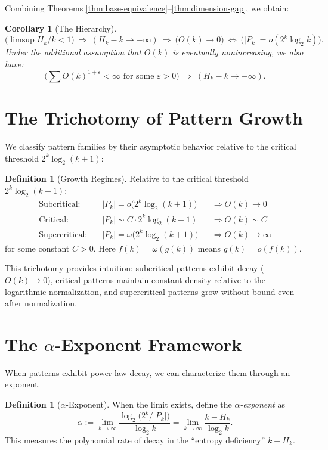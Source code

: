 \documentclass[11pt]{article}
\newtheorem{corollary}[theorem]{Corollary}
\theoremstyle{definition}
\newtheorem{definition}[theorem]{Definition}
\newcommand{\eps}{\varepsilon}
\begin{document}
Combining Theorems \ref{thm:base-equivalence}--\ref{thm:dimension-gap}, we obtain:

\begin{corollary}[The Hierarchy]\label{cor:hierarchy}
\begin{equation}\label{eq:lattice}
\big(\limsup H_k/k<1\big)\ \Rightarrow\ (H_k-k\to-\infty)\ \Rightarrow\ \big(O(k)\to 0\big)\ \Leftrightarrow\ \big(|P_k|=o(2^k\log_2 k)\big).
\end{equation}
Under the additional assumption that $O(k)$ is eventually nonincreasing, we also have:
$$\big(\sum O(k)^{1+\eps} < \infty \text{ for some } \eps > 0\big)\ \Rightarrow\ (H_k-k\to-\infty).$$
\end{corollary}

\section{The Trichotomy of Pattern Growth}

We classify pattern families by their asymptotic behavior relative to the critical threshold $2^k\log_2(k+1)$:

\begin{definition}[Growth Regimes]\label{def:regimes}
Relative to the critical threshold $2^k \log_2(k+1)$:
\begin{align*}
\text{Subcritical:}&\quad |P_k|=o\big(2^k\log_2(k+1)\big) &&\Rightarrow O(k)\to 0\\
\text{Critical:}&\quad |P_k|\sim C\cdot 2^k\log_2(k+1) &&\Rightarrow O(k)\sim C\\
\text{Supercritical:}&\quad |P_k|=\omega\big(2^k\log_2(k+1)\big) &&\Rightarrow O(k)\to\infty
\end{align*}
for some constant $C > 0$. Here $f(k) = \omega(g(k))$ means $g(k) = o(f(k))$.
\end{definition}

This trichotomy provides intuition: subcritical patterns exhibit decay ($O(k) \to 0$), critical patterns maintain constant density relative to the logarithmic normalization, and supercritical patterns grow without bound even after normalization.

\section{The $\alpha$-Exponent Framework}

When patterns exhibit power-law decay, we can characterize them through an exponent.

\begin{definition}[$\alpha$-Exponent]\label{def:alpha}
When the limit exists, define the \emph{$\alpha$-exponent} as
\begin{equation}\label{eq:alpha}
\alpha:=\lim_{k\to\infty}\frac{\log_2\big(2^k/|P_k|\big)}{\log_2 k} = \lim_{k\to\infty}\frac{k - H_k}{\log_2 k}.
\end{equation}
This measures the polynomial rate of decay in the ``entropy deficiency'' $k - H_k$.
\end{definition}
\end{document}
